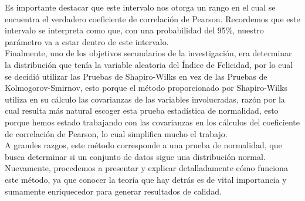 Es importante destacar que este intervalo nos otorga un rango en el cual se encuentra el verdadero coeficiente de correlación de Pearson. Recordemos que este intervalo se interpreta como que, con una probabilidad del 95\%, nuestro parámetro va a estar dentro de este intervalo.\\

Finalmente, uno de los objetivos secundarios de la investigación, era determinar la distribución que tenía la variable aleatoria del Índice de Felicidad, por lo cual se decidió utilizar las Pruebas de Shapiro-Wilks en vez de las Pruebas de Kolmogorov-Smirnov, esto porque el método proporcionado por Shapiro-Wilks utiliza en su cálculo las covarianzas de las variables involucradas, razón por la cual resulta más natural escoger esta prueba estadística de normalidad, esto porque hemos estado trabajando con las covarianzas en los cálculos del coeficiente de correlación de Pearson, lo cual simplifica mucho el trabajo. \\

A grandes razgos, este método corresponde a una prueba de normalidad, que busca determinar si un conjunto de datos sigue una distribución normal. Nuevamente, procedemos a presentar y explicar detalladamente cómo funciona este método, ya que conocer la teoría que hay detrás es de vital importancia y sumamente enriquecedor para generar resultados de calidad. \\

